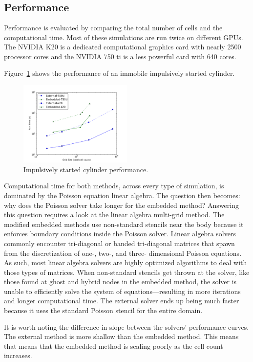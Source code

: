 \documentclass[preprint,12pt,5p]{elsarticle}
\begin{document}
\subsection{Performance}
Performance is evaluated by comparing the total number of cells and the computational time. 
Most of these simulations are run twice on different GPUs. 
The NVIDIA K20 is a dedicated computational graphics card with nearly 2500 processor cores and the NVIDIA 750 ti is a less powerful card with 640 cores.

Figure~\ref{fig:cyperf} shows the performance of an immobile impulsively started cylinder. 
\begin{figure}[!htb]
	\centering
	\includegraphics[width=0.5\textwidth]{cylinder_performance}
	\caption{Impulsively started cylinder performance.}
	\label{fig:cyperf}
\end{figure}
Computational time for both methods, across every type of simulation, is dominated by the Poisson equation linear algebra. 
The question then becomes: why does the Poisson solver take longer for the embedded method? 
Answering this question requires a look at the linear algebra multi-grid method.  
The modified embedded methods use non-standard stencils near the body because it enforces boundary conditions inside the Poisson solver.  
Linear algebra solvers commonly encounter tri-diagonal or banded tri-diagonal
matrices that spawn from the discretization of one-, two-, and three- dimensional Poisson equations. 
As such, most linear algebra solvers are highly optimized algorithms to deal with those types of matrices. 
When non-standard stencils get thrown at the solver, like those found at ghost and hybrid nodes in the embedded method, the solver is unable to efficiently solve the system of equations---resulting in more iterations and longer computational time. 
The external solver ends up being much faster because it uses the standard Poisson stencil for the entire domain. 

It is worth noting the difference in slope between the solvers' performance curves. 
The external method is more shallow than the embedded method. 
This means that means that the embedded method is scaling poorly as the cell count increases. 
\end{document}
